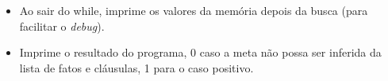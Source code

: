 \begin{itemize}
	\item Ao sair do while, imprime os valores da memória depois da busca (para facilitar o \emph{debug}).
	\item Imprime o resultado do programa, 0 caso a meta não possa ser inferida da lista de fatos e cláusulas, 1 para o caso positivo.
\end{itemize}
